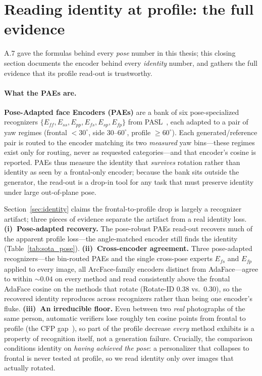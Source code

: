 \section{Reading identity at profile: the full evidence}
\label{sec:appendix_profile}
A.7 gave the formulas behind every \emph{pose} number in this thesis; this
closing section documents the encoder behind every \emph{identity} number,
and gathers the full evidence that its profile read-out is trustworthy.

\paragraph{What the PAEs are.} \textbf{Pose-Adapted face Encoders (PAEs)} are a
bank of six pose-specialized recognizers
$\{E_{ff},E_{ss},E_{pp},E_{fs},E_{sp},E_{fp}\}$ from PASL~\cite{pasl}, each
adapted to a pair of yaw regimes (frontal $<\!30^\circ$, side
$30\text{--}60^\circ$, profile $\geq\!60^\circ$). Each generated/reference pair
is routed to the encoder matching its two \emph{measured} yaw bins---these
regimes exist only for routing, never as requested categories---and that
encoder's cosine is reported. PAEs thus measure the identity that
\emph{survives} rotation rather than identity as seen by a frontal-only
encoder; because the bank sits outside the generator, the read-out is a
drop-in tool for any task that must preserve identity under large
out-of-plane pose.

Section~\ref{sec:identity} claims the frontal-to-profile \csim{} drop is largely
a recognizer artifact; three pieces of evidence separate the artifact from a
real identity loss. \textbf{(i)~Pose-adapted recovery.} The pose-robust PAEs
read-out recovers much of the apparent profile loss---the angle-matched encoder
still finds the identity (Table~\ref{tab:sota_pose}).
\textbf{(ii)~Cross-encoder agreement.} Three pose-adapted recognizers---the
bin-routed PAEs and the single cross-pose experts $E_{fs}$ and $E_{fp}$ applied
to every image, all ArcFace-family encoders distinct from AdaFace---agree to
within $\sim\!0.04$ on every method and read consistently above the frontal
AdaFace cosine on the methods that rotate (Rotate-ID $0.38$ vs.\ $0.30$), so the
recovered identity reproduces across recognizers rather than being one encoder's
fluke. \textbf{(iii)~An irreducible floor.} Even between two \emph{real}
photographs of the same person, automatic verifiers lose roughly ten cosine
points from frontal to profile (the CFP gap~\cite{cfp}), so part of the profile
decrease \emph{every} method exhibits is a property of recognition itself, not a
generation failure. Crucially, the comparison conditions identity on
\emph{having achieved the pose}: a personalizer that collapses to frontal is
never tested at profile, so we read identity only over images that actually
rotated.

